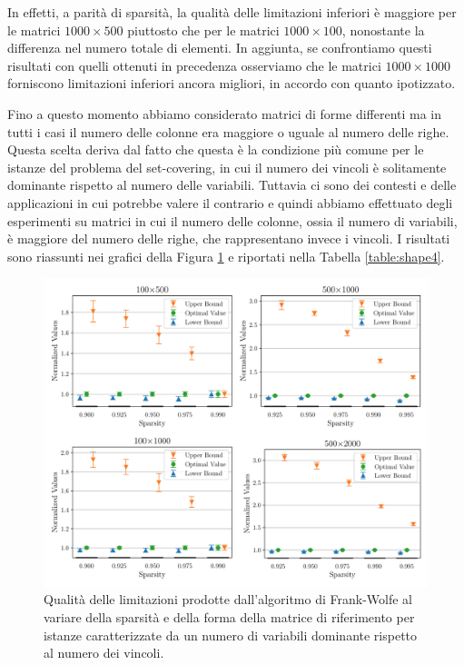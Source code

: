 In effetti, a parità di sparsità, la qualità delle limitazioni inferiori è maggiore per le matrici \( 1000\times 500 \)
piuttosto che per le matrici  \( 1000\times 100 \), nonostante la differenza nel numero totale di elementi. In aggiunta,
se confrontiamo questi risultati con quelli ottenuti in precedenza osserviamo che le matrici  \( 1000\times 1000 \)
forniscono limitazioni inferiori ancora migliori, in accordo con quanto ipotizzato.

Fino a questo momento abbiamo considerato matrici di forme differenti ma in tutti i casi il numero delle colonne era
maggiore o uguale al numero delle righe. Questa scelta deriva dal fatto che questa è la condizione più comune per le
istanze del problema del set-covering, in cui il numero dei vincoli è solitamente dominante rispetto al numero delle
variabili. Tuttavia ci sono dei contesti e delle applicazioni in cui potrebbe valere il contrario e quindi abbiamo
effettuato degli esperimenti su matrici in cui il numero delle colonne, ossia il numero di variabili, è maggiore del
numero delle righe, che rappresentano invece i vincoli. I risultati sono riassunti nei grafici della Figura
\ref{fig:shape4} e riportati nella Tabella \ref{table:shape4}.

\begin{figure}[ht]
    \centering
    \includegraphics[width=\textwidth]{assets/figures/reverse.pdf}
    \caption{Qualità delle limitazioni prodotte dall’algoritmo di Frank-Wolfe al variare della sparsità e della forma
    della matrice di riferimento per istanze caratterizzate da un numero di variabili dominante rispetto al numero dei
    vincoli.}
    \label{fig:shape4}
\end{figure}

